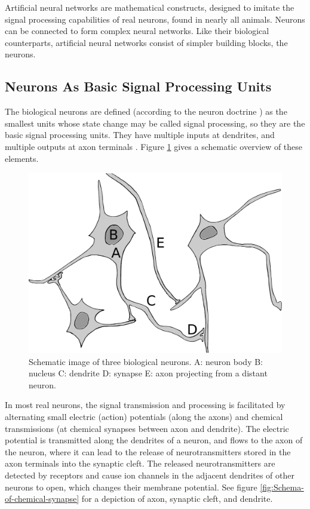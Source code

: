 Artificial neural networks are
mathematical constructs, designed to imitate the signal processing
capabilities of real neurons, found in nearly all animals. Neurons
can be connected to form complex neural networks. Like their biological
counterparts, artificial neural networks consist of simpler building
blocks, the neurons.

\subsection{Neurons As Basic Signal Processing Units}

The biological neurons are defined (according to the neuron doctrine
\cite{BullockDouglas2005}) as the smallest units whose state change
may be called signal processing, so they are the basic signal processing
units. They have multiple inputs at dendrites, and multiple outputs
at axon terminals \cite{ByrneDafny1997}. Figure \ref{fig:Schematic-image-of-biological-neurons}
gives a schematic overview of these elements.

\begin{figure}
\begin{centering}
\includegraphics[width=0.8\columnwidth]{images/neurons}
\par\end{centering}
\caption[Schematic image of three biological neurons.]{\label{fig:Schematic-image-of-biological-neurons}Schematic image
of three biological neurons. A: neuron body B: nucleus C: dendrite
D: synapse E: axon projecting from a distant neuron.}
\end{figure}

In most real neurons, the signal transmission and processing is facilitated
by alternating small electric (action) potentials (along the axons)
and chemical transmissions (at chemical synapses between axon and
dendrite). The electric potential is transmitted along the dendrites
of a neuron, and flows to the axon of the neuron, where it can lead
to the release of neurotransmitters stored in the axon terminals into
the synaptic cleft. The released neurotransmitters are detected by
receptors and cause ion channels in the adjacent dendrites of other
neurons to open, which changes their membrane potential. See figure
\ref{fig:Schema-of-chemical-synapse} for a depiction of axon, synaptic
cleft, and dendrite.


